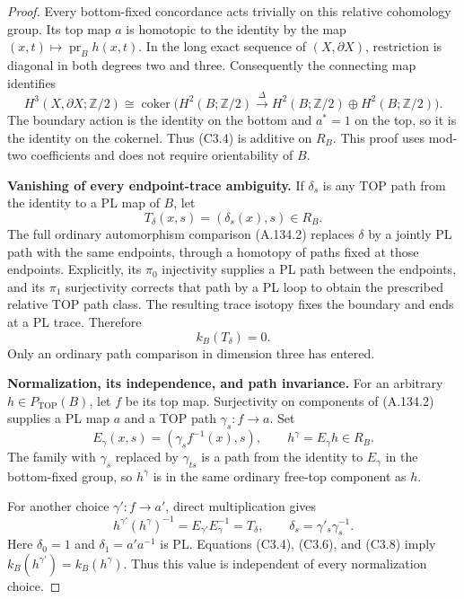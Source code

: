 \begin{proof}
Every bottom-fixed concordance acts trivially on this relative
cohomology group. Its top map $a$ is homotopic to the identity by the
map $(x,t)\mapsto\operatorname{pr}_B h(x,t)$. In the long exact
sequence of $(X,\partial X)$, restriction is diagonal in both degrees
two and three. Consequently the connecting map identifies
\[
 H^3(X,\partial X;\mathbb Z/2)
  \cong
 \operatorname{coker}\bigl(
 H^2(B;\mathbb Z/2)\xrightarrow{\Delta}
 H^2(B;\mathbb Z/2)\oplus H^2(B;\mathbb Z/2)\bigr).
                                                        \tag{C3.6}
\]
The boundary action is the identity on the bottom and $a^*=1$ on the
top, so it is the identity on the cokernel. Thus (C3.4) is additive
on $R_B$. This proof uses mod-two coefficients and does not require
orientability of $B$.

\textbf{Vanishing of every endpoint-trace ambiguity.}
If $\delta_s$ is any TOP path from the identity to a PL map of $B$,
let
\[
        T_\delta(x,s)=(\delta_s(x),s)\in R_B.
                                                        \tag{C3.7}
\]
The full ordinary automorphism comparison (A.134.2) replaces
$\delta$ by a jointly PL path with the same endpoints, through a
homotopy of paths fixed at those endpoints. Explicitly, its
$\pi_0$ injectivity supplies a PL path between the endpoints, and its
$\pi_1$ surjectivity corrects that path by a PL loop to obtain the
prescribed relative TOP path class. The resulting trace isotopy fixes
the boundary and ends at a PL trace. Therefore
\[
                         k_B(T_\delta)=0.
                                                        \tag{C3.8}
\]
Only an ordinary path comparison in dimension three has entered.

\textbf{Normalization, its independence, and path invariance.}
For an arbitrary $h\in P_{\mathrm{TOP}}(B)$, let $f$ be its top map.
Surjectivity on components of (A.134.2) supplies a PL map $a$ and a
TOP path $\gamma_s:f\to a$. Set
\[
 E_\gamma(x,s)=(\gamma_s f^{-1}(x),s),\qquad
                       h^\gamma=E_\gamma h\in R_B.
                                                        \tag{C3.9}
\]
The family with $\gamma_s$ replaced by $\gamma_{ts}$ is a path from
the identity to $E_\gamma$ in the bottom-fixed group, so $h^\gamma$
is in the same ordinary free-top component as $h$.

For another choice $\gamma':f\to a'$, direct multiplication gives
\[
 h^{\gamma'}(h^\gamma)^{-1}=E_{\gamma'}E_\gamma^{-1}
                  =T_\delta,
 \qquad \delta_s=\gamma'_s\gamma_s^{-1}.
                                                        \tag{C3.10}
\]
Here $\delta_0=1$ and $\delta_1=a'a^{-1}$ is PL. Equations
(C3.4), (C3.6), and (C3.8) imply
$k_B(h^{\gamma'})=k_B(h^\gamma)$. Thus this value is independent of
every normalization choice.


\end{proof}
